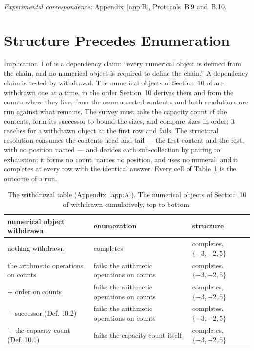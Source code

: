 \documentclass[pdflatex,sn-mathphys-num]{sn-jnl}
\theoremstyle{thmstyleone}%
\theoremstyle{thmstyletwo}%
\theoremstyle{thmstylethree}%
\newcommand{\PA}{\cite{Swanagon2026PA}}
\newcommand{\q}[1]{``#1''}        %
\begin{document}
\noindent\emph{Experimental correspondence:} Appendix~\ref{app:B}, Protocols~B.9 and~B.10.

\section{Structure Precedes Enumeration}\label{sec:precedence}
Implication~I of \PA{} is a dependency claim: \q{every numerical object is defined from the chain, and no numerical object is required to define the chain.} A dependency claim is tested by withdrawal. The numerical objects of Section~10 of \PA{} are withdrawn one at a time, in the order Section~10 derives them and from the counts where they live, from the same asserted contents, and both resolutions are run against what remains. The survey must take the capacity count of the contents, form its successor to bound the sizes, and compare sizes in order; it reaches for a withdrawn object at the first row and fails. The structural resolution consumes the contents head and tail --- the first content and the rest, with no position named --- and decides each sub-collection by pairing to exhaustion; it forms no count, names no position, and uses no numeral, and it completes at every row with the identical answer. Every cell of Table~\ref{tab:withdrawal} is the outcome of a run.

\begin{table}[!htbp]
\centering\small
\caption{The withdrawal table (Appendix~\ref{app:A}). The numerical objects of Section~10 of \PA{} withdrawn cumulatively, top to bottom.}
\label{tab:withdrawal}
\begin{tabular}{lll}
\toprule
numerical object withdrawn & enumeration & structure \\
\midrule
nothing withdrawn & completes & completes, $\{-3,-2,5\}$ \\
the arithmetic operations on counts & fails: the arithmetic operations on counts & completes, $\{-3,-2,5\}$ \\
+ order on counts & fails: the arithmetic operations on counts & completes, $\{-3,-2,5\}$ \\
+ successor (Def. 10.2) & fails: the arithmetic operations on counts & completes, $\{-3,-2,5\}$ \\
+ the capacity count (Def. 10.1) & fails: the capacity count itself & completes, $\{-3,-2,5\}$ \\
\bottomrule
\end{tabular}
\end{table}
\end{document}
